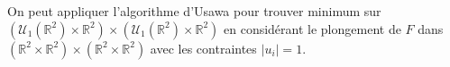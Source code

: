\documentclass[a4paper,10pt]{article}
\begin{document}
On peut appliquer l'algorithme d'Usawa pour trouver minimum sur  $(\mathcal{U}_1(\mathbb{R}^2)\times\mathbb{R}^2) \times (\mathcal{U}_1(\mathbb{R}^2)\times\mathbb{R}^2)$ en considérant le plongement de $F$ dans  $(\mathbb{R}^2\times\mathbb{R}^2) \times (\mathbb{R}^2\times\mathbb{R}^2)$ avec les contraintes $|u_i|=1$. 


	
\newpage


\end{document}
